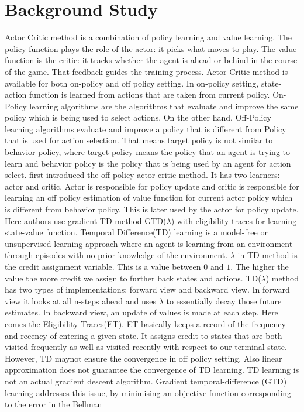 \section{Background Study}
Actor Critic method is a combination of policy learning and value learning.  The policy function plays the role of the actor: it picks what moves to play. The value function is the critic: it tracks whether the agent is ahead or behind in the course of the game. That feedback guides the training process. Actor-Critic method is available for both on-policy and off policy setting. In on-policy setting, state-action function is learned from actions that are taken from current policy. On-Policy learning algorithms are the algorithms that evaluate and improve the same policy which is being used to select actions. On the other hand, Off-Policy learning algorithms evaluate and improve a policy that is different from Policy that is used for action selection. That means target policy is not similar to behavior policy, where target policy means the policy that an agent is trying to learn and behavior policy is the policy that is being used by an agent for action select. \cite{degris2012off} first introduced the off-policy actor critic method. It has two learners: actor and critic. Actor is responsible for policy update and critic is responsible for learning an off policy estimation of value function for current actor policy which is different from behavior policy. This is later used by the actor for policy update. Here authors use gradient TD method GTD($\lambda$) with eligibility traces for learning state-value function. Temporal Difference(TD) learning is a model-free or unsupervised learning approach where an agent is learning from an environment through episodes with no prior knowledge of the environment. $\lambda$ in TD method is the credit assignment variable. This is a value between $0$ and $1$. The higher the value the more credit we assign to further back states and actions. TD($\lambda$) method has two types of implementations: forward view and backward view. In forward view it looks at all n-steps ahead and uses $\lambda$ to essentially decay those future estimates.
In backward view, an update of values is made at each step. Here comes the Eligibility Traces(ET). ET basically keeps a record of the frequency and recency of entering a given state. It assigns credit to states that are both visited frequently as well as visited recently with respect to our terminal state. However, TD maynot ensure the convergence in off policy setting. Also linear approximation does not guarantee the convergence of TD learning.  TD learning is not an actual gradient descent algorithm. Gradient temporal-difference (GTD) learning addresses this issue, by minimising an objective function corresponding to the error in the Bellman
